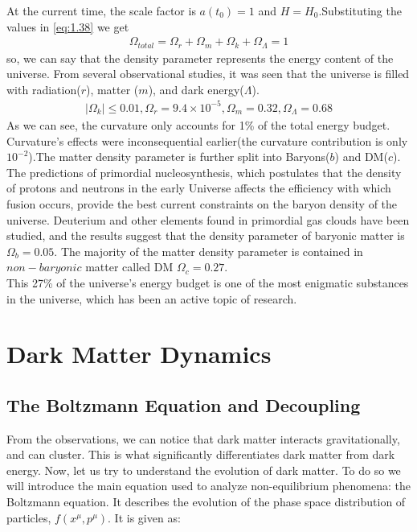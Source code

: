 At the current time, the scale factor is $a(t_0) = 1$ and $H =H_0$.Substituting the values in \ref{eq:1.38} we get
\begin{align}
    \Omega_{total} = \Omega_{r} + \Omega_{m} + \Omega_{k} +\Omega_{\Lambda} = 1 \label{1.39}
\end{align}
so, we can say that the density parameter represents the energy content of the universe. From several observational studies, it was seen that the universe is filled with radiation($r$), matter ($m$), and dark energy($\Lambda$).
\begin{align}
    |\Omega_k| \leq 0.01 , \Omega_r = 9.4 \times 10^{-5} , \Omega_m = 0.32 , \Omega_{\Lambda} =0.68 \label{1.40}
\end{align}
As we can see, the curvature only accounts for 1\% of the total energy budget. Curvature's effects were inconsequential earlier(the curvature contribution is only $10^{-2}$).The matter density parameter is further split into Baryons($b$) and DM($c$).\\
\hspace{0.5cm}The predictions of primordial nucleosynthesis, which postulates that the density of protons and neutrons in the early Universe affects the efficiency with which fusion occurs, provide the best current constraints on the baryon density of the universe. Deuterium and other elements found in primordial gas clouds have been studied, and the results suggest that the density parameter of baryonic matter is $\Omega_{b} = 0.05$. 
The majority of the matter density parameter is contained in $non-baryonic$ matter called DM $\Omega_{c} = 0.27$.\\
\hspace{0.5cm}This 27\% of the universe's energy budget is one of the most enigmatic substances in the universe, which has been an active topic of research. 



\section{Dark Matter Dynamics}
\subsection{The Boltzmann Equation and Decoupling}


\hspace{0.5cm}From the observations, we can notice that dark matter interacts gravitationally, and can cluster. This is what significantly differentiates dark matter from dark energy. Now, let us try to understand the evolution of dark matter. To do so we will introduce the main equation used to analyze non-equilibrium phenomena: the Boltzmann equation. It describes the evolution of the phase space distribution of particles, \(f(x^{\mu},p^{\mu})\). It is given as:

